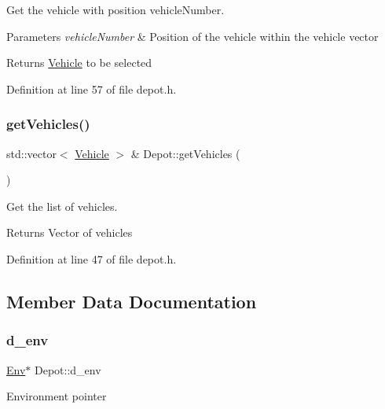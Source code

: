 Get the vehicle with position vehicle\+Number. 
\begin{DoxyParams}{Parameters}
{\em vehicle\+Number} & Position of the vehicle within the vehicle vector \\
\hline
\end{DoxyParams}
\begin{DoxyReturn}{Returns}
\hyperlink{class_vehicle}{Vehicle} to be selected 
\end{DoxyReturn}


Definition at line 57 of file depot.\+h.

\mbox{\label{class_depot_a7ebccd66bec499d9dc7411dc78efc348}} 
\subsubsection{\texorpdfstring{get\+Vehicles()}{getVehicles()}}
{\footnotesize\ttfamily std\+::vector$<$ \hyperlink{class_vehicle}{Vehicle} $>$ \& Depot\+::get\+Vehicles (\begin{DoxyParamCaption}{ }\end{DoxyParamCaption})\hspace{0.3cm}{\ttfamily [inline]}}

Get the list of vehicles. \begin{DoxyReturn}{Returns}
Vector of vehicles 
\end{DoxyReturn}


Definition at line 47 of file depot.\+h.



\subsection{Member Data Documentation}
\mbox{\label{class_depot_a182a0a8e85a7cee44aaa9c1895a8d05a}} 
\subsubsection{\texorpdfstring{d\+\_\+env}{d\_env}}
{\footnotesize\ttfamily \hyperlink{class_env}{Env}$\ast$ Depot\+::d\+\_\+env\hspace{0.3cm}{\ttfamily [private]}}

Environment pointer 

